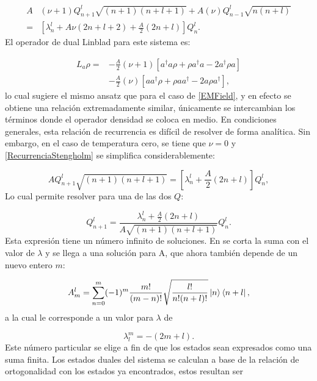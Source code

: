 \documentclass[a4paper,10pt]{report}
\begin{document}
\begin{align}\label{RecurrenciaStengholm}
A&(\nu+1) Q_{n+1}^l \sqrt{(n+1)(n+l+1) }+ A(\nu) Q_{n-1}^l\sqrt{n(n+l)}\\ \nonumber
=&[\lambda_n^l+A\nu(2n+l+2)+\frac{A}{2}(2n+l)]Q_{n}^l.
\end{align} El operador de dual Linblad para este sistema es:

\begin{align}
L_a \rho =& - \frac{A}{2}(\nu + 1)[a^\dagger a\rho + \rho a^\dagger a -2a^\dagger\rho a] \nonumber \\
 &- \frac{A}{2}(\nu)[ aa^\dagger\rho + \rho  aa^\dagger -2a\rho a^\dagger],
\end{align} lo cual sugiere el mismo ansatz que para el caso de \eqref{EMField}, y en efecto se obtiene una relación extremadamente similar, únicamente se intercambian los términos donde el operador densidad se coloca en medio. En condiciones generales, esta relación de recurrencia es difícil de resolver de forma analítica. Sin embargo, en el caso de temperatura cero, se tiene que $\nu = 0$ y \eqref{RecurrenciaStengholm} se simplifica considerablemente:

\begin{equation}
AQ_{n+1}^l\sqrt{(n+1)(n+l+1)}=[\lambda_n^l + \frac{A}{2}(2n+l)]Q_n^l,
\end{equation} Lo cual permite resolver para una de las dos $Q$:

\begin{equation}
Q_{n+1}^l = \frac{\lambda_n^l + \frac{A}{2}(2n+l)}{A\sqrt{(n+1)(n+l+1)}}Q_n^l.
\end{equation}Esta expresión tiene un número infinito de soluciones. En \cite{BarnettSD} se corta la suma con el valor de $\lambda$ y se llega a una solución para A, que ahora también depende de un nuevo entero $m$:

\begin{equation}
A_m^l = \sum_{n=0}^m (-1)^m \frac{m!}{(m-n)!}\sqrt{\frac{l!}{n!(n+l)!}}\Ket{n}\Bra{n+l},
\end{equation} a la cual le corresponde a un valor para $\lambda$ de

\begin{equation}
\lambda_l^m = -(2m+l).
\end{equation}Este número particular se elige a fin de que los estados sean expresados como una suma finita. Los estados duales del sistema se calculan a base de la relación de ortogonalidad con los estados ya encontrados, estos resultan ser \cite{BarnettSD}
\end{document}
